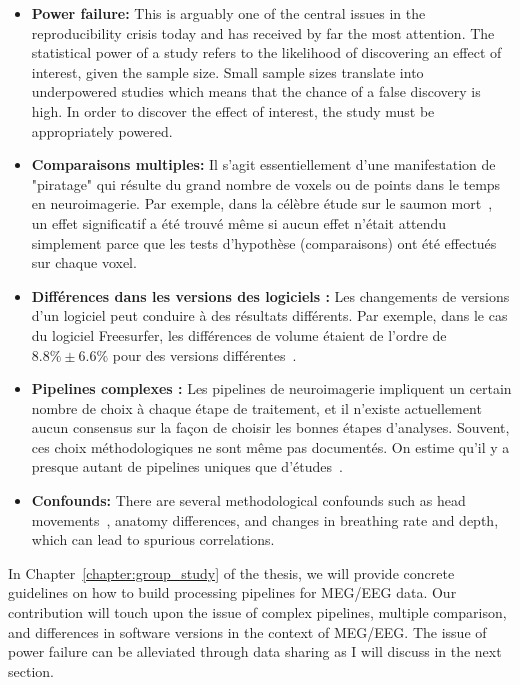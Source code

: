 \begin{itemize}[noitemsep,partopsep=0pt]
\item \textbf{Power failure:} This is arguably one of the central issues in the reproducibility crisis today and has received by far the most attention. The statistical power of a study refers to the likelihood of discovering an effect of interest, given the sample size. Small sample sizes translate into underpowered studies which means that the chance of a false discovery is high. In order to discover the effect of interest, the study must be appropriately powered.
%
\item \textbf{Comparaisons multiples:} Il s'agit essentiellement d'une manifestation de "piratage" qui résulte du grand nombre de voxels ou de points dans le temps en neuroimagerie. Par exemple, dans la célèbre étude sur le saumon mort~\citep{bennett2009neural}, un effet significatif a été trouvé même si aucun effet n'était attendu simplement parce que les tests d'hypothèse (comparaisons) ont été effectués sur chaque voxel.
%
\item \textbf{Différences dans les versions des logiciels :} Les changements de versions d’un logiciel peut conduire à des résultats différents. Par exemple, dans le cas du logiciel Freesurfer, les différences de volume étaient de l'ordre de $8.8\% \pm 6.6\%$ pour des versions différentes~\citep{gronenschild2012effects}.
%
\item \textbf{Pipelines complexes :} Les pipelines de neuroimagerie impliquent un certain nombre de choix à chaque étape de traitement, et il n'existe actuellement aucun consensus sur la façon de choisir les bonnes étapes d’analyses. Souvent, ces choix méthodologiques ne sont même pas documentés. On estime qu'il y a presque autant de pipelines uniques que d'études~\citep{Carp2012289}.
\item \textbf{Confounds:} There are several methodological confounds such as head movements~\citep{yendiki2014spurious}, anatomy differences, and changes in breathing rate and depth, which can lead to spurious correlations.
\end{itemize}

In Chapter~\ref{chapter:group_study} of the thesis, we will provide concrete guidelines on how to build processing pipelines for \ac{MEG}/\ac{EEG} data. Our contribution will touch upon the issue of complex pipelines, multiple comparison, and differences in software versions in the context of \ac{MEG}/\ac{EEG}. The issue of power failure can be alleviated through data sharing as I will discuss in the next section.

